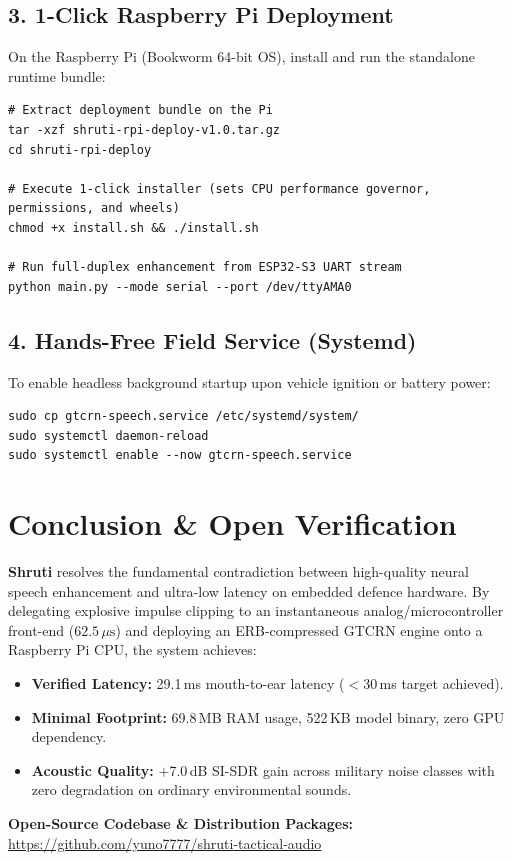 \documentclass[11pt,a4paper]{article}
\begin{document}
\subsection{3. 1-Click Raspberry Pi Deployment}
On the Raspberry Pi (Bookworm 64-bit OS), install and run the standalone runtime bundle:
\begin{verbatim}
# Extract deployment bundle on the Pi
tar -xzf shruti-rpi-deploy-v1.0.tar.gz
cd shruti-rpi-deploy

# Execute 1-click installer (sets CPU performance governor, permissions, and wheels)
chmod +x install.sh && ./install.sh

# Run full-duplex enhancement from ESP32-S3 UART stream
python main.py --mode serial --port /dev/ttyAMA0
\end{verbatim}

\subsection{4. Hands-Free Field Service (Systemd)}
To enable headless background startup upon vehicle ignition or battery power:
\begin{verbatim}
sudo cp gtcrn-speech.service /etc/systemd/system/
sudo systemctl daemon-reload
sudo systemctl enable --now gtcrn-speech.service
\end{verbatim}

\section{Conclusion \& Open Verification}

\textbf{Shruti} resolves the fundamental contradiction between high-quality neural speech enhancement and ultra-low latency on embedded defence hardware. By delegating explosive impulse clipping to an instantaneous analog/microcontroller front-end ($62.5\,\mu\text{s}$) and deploying an ERB-compressed GTCRN engine onto a Raspberry Pi CPU, the system achieves:
\begin{itemize}
    \item \textbf{Verified Latency:} 29.1\,ms mouth-to-ear latency ($<$30\,ms target achieved).
    \item \textbf{Minimal Footprint:} 69.8\,MB RAM usage, 522\,KB model binary, zero GPU dependency.
    \item \textbf{Acoustic Quality:} $+$7.0\,dB SI-SDR gain across military noise classes with zero degradation on ordinary environmental sounds.
\end{itemize}

\vspace{6pt}
\noindent\textbf{Open-Source Codebase \& Distribution Packages:}\\
\url{https://github.com/yuno7777/shruti-tactical-audio}
\end{document}
